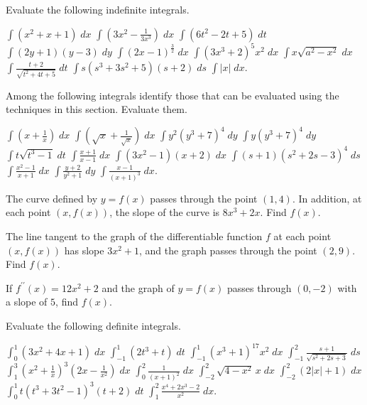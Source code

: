 \begin{exercises}

Evaluate the following indefinite integrals.
\begin{exenum}
\x
$\int (x^2 + x + 1) \; dx$
\x
$\int \left(3x^2 - \frac1{3x^3}\right) \; dx$
\x
$\int (6t^2 - 2t + 5) \; dt$
\x
$\int (2y + 1)(y - 3) \; dy$
\x
$\int (2x-1)^\frac32 \; dx$
\x
$\int (3x^3 + 2)^5x^2 \; dx$
\x
$\int x\sqrt{a^2 - x^2} \; dx$
\x
$\int \frac{t + 2}{\sqrt{t^2 + 4t + 5}} \; dt$
\x
$\int s(s^3 + 3s^2 + 5)(s + 2) \; ds$
\x
$\int |x| \; dx$.
\end{exenum}

Among the following integrals identify
those that can be evaluated using the techniques
in this section.  Evaluate them.
\begin{exenum}
\x
$\int \left(x + \frac1x\right) \; dx$
\x
$\int \left(\sqrt{x} + \frac1{\sqrt{x}}\right) \; dx$
\x
$\int y^2(y^3 + 7)^4 \; dy$
\x
$\int y(y^3 + 7)^4 \; dy$
\x
$\int t\sqrt{t^3 - 1} \; dt$
\x
$\int \frac{x+1}{x-1} \; dx$
\x
$\int (3x^2 - 1)(x + 2) \; dx$
\x
$\int (s+1)(s^2 + 2s - 3)^4 \; ds$
\x
$\int \frac{x^2 - 1}{x + 1} \; dx$
\x
$\int \frac{y + 2}{y^2 + 1} \; dy$
\x
$\int \frac{x - 1}{(x + 1)^3} \; dx$.
\end{exenum}

The curve defined by $y = f(x)$
passes through the point $(1,4)$.
In addition, at each point $(x,f(x))$,
the slope of the curve is
$8x^3 + 2x$.  Find $f(x)$.

The line tangent to the graph of the differentiable
function $f$ at each point $(x,f(x))$ has slope
$3x^2 + 1$, and the graph passes through the point
$(2,9)$.  Find $f(x)$.

If $f^{\prime\prime}(x) = 12x^2 + 2$
and the graph of $y = f(x)$ passes through
$(0,-2)$ with a slope of $5$, find $f(x)$.

Evaluate the following definite integrals.
\begin{exenum}
\x
$\int_0^1 (3x^2 + 4x + 1) \; dx$
\x
$\int_{-1}^1 (2t^3 + t) \; dt$
\x
$\int_{-1}^1 (x^3 + 1)^{17}x^2 \; dx$
\x
$\int_{-1}^2 \frac{s+1}{\sqrt{s^2 + 2s + 3}} \; ds$
\x
$\int_1^3 \left(x^2 + \frac1x\right)^3 \left(2x - \frac1{x^2}
\right) \; dx$
\x
$\int_0^2 \frac1{(x+1)^2} \; dx$
\x
$\int_{-2}^2 \sqrt{4-x^2} \, x \; dx$
\x
$\int_{-2}^2 (2|x| + 1) \; dx$
\x
$\int_0^1 t(t^3 + 3t^2 - 1)^3 (t + 2) \; dt$
\x
$\int_1^2 \frac{x^4 + 2x^3 - 2}{x^2} \; dx$.
\end{exenum}


\end{exercises}
